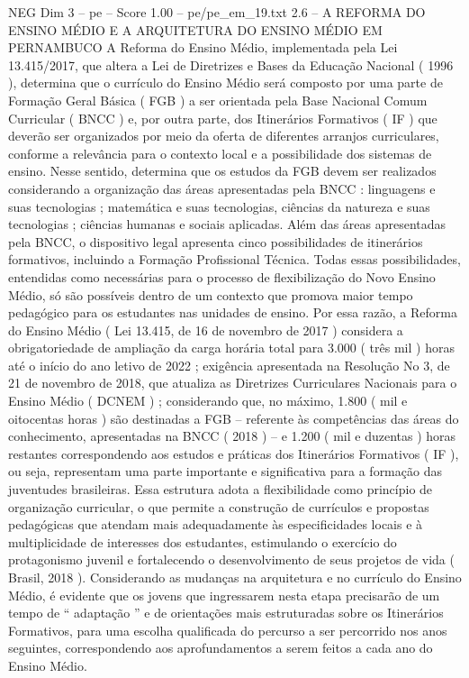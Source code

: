 \begin{textsample}{NEG Dim 3 – pe – Score 1.00 – pe/pe\_em\_19.txt}  \label{ex:f3_neg_017}
2.6 – A REFORMA DO ENSINO MÉDIO E A ARQUITETURA DO ENSINO MÉDIO EM PERNAMBUCO A Reforma do Ensino Médio, implementada pela Lei 13.415/2017, que altera a Lei de Diretrizes e Bases da Educação Nacional ( 1996 ), determina que o currículo do Ensino Médio será composto por uma parte de Formação Geral Básica ( FGB ) a ser orientada pela Base Nacional Comum Curricular ( BNCC ) e, por outra parte, dos Itinerários Formativos ( IF ) que deverão ser organizados por meio da oferta de diferentes arranjos curriculares, conforme a relevância para o contexto local e a possibilidade dos sistemas de ensino.
Nesse sentido, determina que os estudos da FGB devem ser realizados considerando a organização das áreas apresentadas pela BNCC : linguagens e suas tecnologias ; matemática e suas tecnologias, ciências da natureza e suas tecnologias ; ciências humanas e sociais aplicadas.
Além das áreas apresentadas pela BNCC, o dispositivo legal apresenta cinco possibilidades de itinerários formativos, incluindo a Formação Profissional Técnica.
Todas essas possibilidades, entendidas como necessárias para o processo de flexibilização do Novo Ensino Médio, só são possíveis dentro de um contexto que promova maior tempo pedagógico para os estudantes nas unidades de ensino.
Por essa razão, a Reforma do Ensino Médio ( Lei 13.415, de 16 de novembro de 2017 ) considera a obrigatoriedade de ampliação da carga horária total para 3.000 ( três mil ) horas até o início do ano letivo de 2022 ; exigência apresentada na Resolução No 3, de 21 de novembro de 2018, que atualiza as Diretrizes Curriculares Nacionais para o Ensino Médio ( DCNEM ) ; considerando que, no máximo, 1.800 ( mil e oitocentas horas ) são destinadas a FGB – referente às competências das áreas do conhecimento, apresentadas na BNCC ( 2018 ) – e 1.200 ( mil e duzentas ) horas restantes correspondendo aos estudos e práticas dos Itinerários Formativos ( IF ), ou seja, representam uma parte importante e significativa para a formação das juventudes brasileiras.
Essa estrutura adota a flexibilidade como princípio de organização curricular, o que permite a construção de currículos e propostas pedagógicas que atendam mais adequadamente às especificidades locais e à multiplicidade de interesses dos estudantes, estimulando o exercício do protagonismo juvenil e fortalecendo o desenvolvimento de seus projetos de vida ( Brasil, 2018 ).
Considerando as mudanças na arquitetura e no currículo do Ensino Médio, é evidente que os jovens que ingressarem nesta etapa precisarão de um tempo de “ adaptação ” e de orientações mais estruturadas sobre os Itinerários Formativos, para uma escolha qualificada do percurso a ser percorrido nos anos seguintes, correspondendo aos aprofundamentos a serem feitos a cada ano do Ensino Médio.

\end{textsample}
